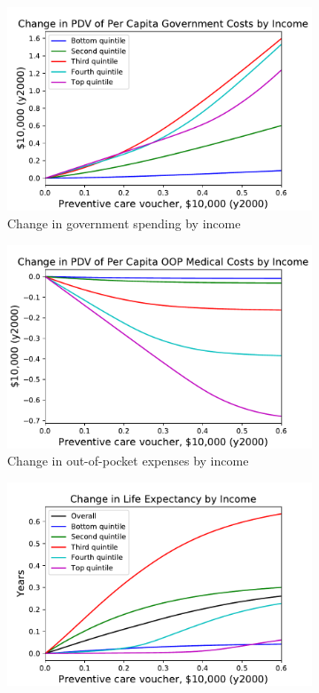\documentclass[12pt,pdftex,letterpaper]{article}
\begin{document}
\begin{figure}[h!]
\begin{subfigure}[b]{0.49\textwidth}
        \includegraphics[width=\textwidth]{../Figures/PreventiveSubGovtChangeByInc.pdf}
        \caption{Change in government spending by income}
    \end{subfigure}
    \begin{subfigure}[b]{0.49\textwidth}
        \centering
        \includegraphics[width=\textwidth]{../Figures/PreventiveSubOOPchangeByInc.pdf}
        \caption{Change in out-of-pocket expenses by income}
    \end{subfigure}
    \begin{subfigure}[b]{0.49\textwidth}
        \centering
        \includegraphics[width=\textwidth]{../Figures/PreventiveSubLifeExp.pdf}

\end{subfigure}
\end{figure}
\end{document}
